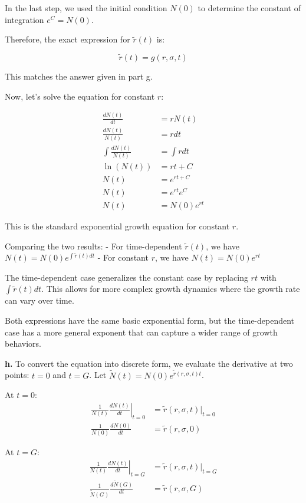 \documentclass{article}
\begin{document}
In the last step, we used the initial condition $N(0)$ to determine the constant of integration $e^C = N(0)$.

Therefore, the exact expression for $\tilde{r}(t)$ is:

\begin{equation*}
\tilde{r}(t) = g(r,\sigma,t)
\end{equation*}

This matches the answer given in part g.

Now, let's solve the equation for constant $r$:

\begin{align*}
\frac{dN(t)}{dt} &= rN(t) \\
\frac{dN(t)}{N(t)} &= r dt \\
\int \frac{dN(t)}{N(t)} &= \int r dt \\
\ln(N(t)) &= rt + C \\
N(t) &= e^{rt + C} \\
N(t) &= e^{rt} e^C \\
N(t) &= N(0)e^{rt}
\end{align*}

This is the standard exponential growth equation for constant $r$. 

Comparing the two results:
- For time-dependent $\tilde{r}(t)$, we have $N(t) = N(0)e^{\int \tilde{r}(t)dt}$
- For constant $r$, we have $N(t) = N(0)e^{rt}$

The time-dependent case generalizes the constant case by replacing $rt$ with $\int \tilde{r}(t)dt$. This allows for more complex growth dynamics where the growth rate can vary over time.

Both expressions have the same basic exponential form, but the time-dependent case has a more general exponent that can capture a wider range of growth behaviors.

\textbf{h.} To convert the equation into discrete form, we evaluate the derivative at two points: $t=0$ and $t=G$. Let $\tilde{N}(t) = N(0)e^{\tilde{r}(r,\sigma,t)t}$.

At $t=0$:
\begin{align*}
\left.\frac{1}{N(t)}\frac{dN(t)}{dt}\right|_{t=0} &= \tilde{r}(r,\sigma,t)|_{t=0} \\
\frac{1}{N(0)}\frac{dN(0)}{dt} &= \tilde{r}(r,\sigma,0)
\end{align*}

At $t=G$:
\begin{align*}
\left.\frac{1}{N(t)}\frac{dN(t)}{dt}\right|_{t=G} &= \tilde{r}(r,\sigma,t)|_{t=G} \\
\frac{1}{\tilde{N}(G)}\frac{d\tilde{N}(G)}{dt} &= \tilde{r}(r,\sigma,G)
\end{align*}
\end{document}
